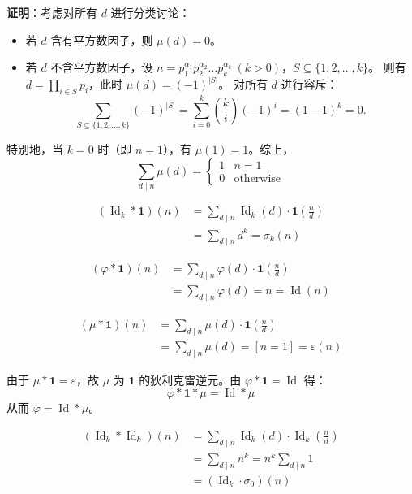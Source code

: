 \textbf{证明}：考虑对所有 $d$ 进行分类讨论：
\begin{itemize}
    \item 若 $d$ 含有平方数因子，则 $\mu(d) = 0$。
    \item 若 $d$ 不含平方数因子，设 $n = p_1^{\alpha_1}p_2^{\alpha_2}\dots p_k^{\alpha_k}\ (k>0)$，$S \subseteq \{1,2,\dots,k\}$。
          则有 $d = \prod_{i\in S} p_i$，此时 $\mu(d) = (-1)^{|S|}$。
          对所有 $d$ 进行容斥：
    \[
    \sum_{S \subseteq \{1,2,\dots,k\}} (-1)^{|S|}
    = \sum_{i=0}^{k} \binom{k}{i} (-1)^i
    = (1-1)^k = 0.
    \]
\end{itemize}
特别地，当 $k=0$ 时（即 $n=1$），有 $\mu(1)=1$。综上，
\[
\sum_{d\mid n} \mu(d) = 
\begin{cases}
1 & n=1 \\ 0 & \text{otherwise}
\end{cases}
\]


\[
\begin{aligned}
(\operatorname{Id}_k * \mathbf{1})(n) 
&= \sum_{d\mid n} \operatorname{Id}_k(d) \cdot \mathbf{1}\!\left(\frac{n}{d}\right) \\
&= \sum_{d\mid n} d^k = \sigma_k(n)
\end{aligned}
\]

\[
\begin{aligned}
(\varphi * \mathbf{1})(n) 
&= \sum_{d\mid n} \varphi(d) \cdot \mathbf{1}\!\left(\frac{n}{d}\right) \\
&= \sum_{d\mid n} \varphi(d) = n = \operatorname{Id}(n)
\end{aligned}
\]

\[
\begin{aligned}
(\mu * \mathbf{1})(n) 
&= \sum_{d\mid n} \mu(d) \cdot \mathbf{1}\!\left(\frac{n}{d}\right) \\
&= \sum_{d\mid n} \mu(d) = [n=1] = \varepsilon(n)
\end{aligned}
\]

由于 $\mu * \mathbf{1} = \varepsilon$，故 $\mu$ 为 $\mathbf{1}$ 的狄利克雷逆元。由 $\varphi * \mathbf{1} = \operatorname{Id}$ 得：
\[
\varphi * \mathbf{1} * \mu = \operatorname{Id} * \mu
\]
从而 $\varphi = \operatorname{Id} * \mu$。

\[
\begin{aligned}
(\operatorname{Id}_k * \operatorname{Id}_k)(n) 
&= \sum_{d\mid n} \operatorname{Id}_k(d) \cdot \operatorname{Id}_k\!\left(\frac{n}{d}\right) \\
&= \sum_{d\mid n} n^k = n^k \sum_{d\mid n} 1 \\
&= (\operatorname{Id}_k \cdot \sigma_0)(n)
\end{aligned}
\]

